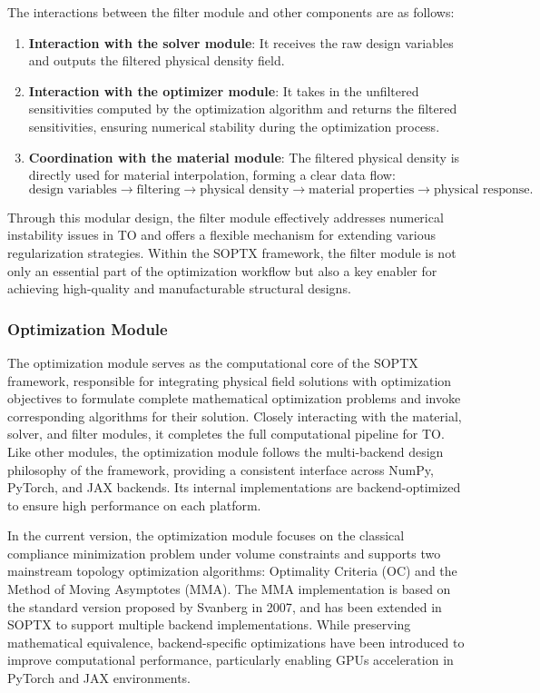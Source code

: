 \documentclass[mathpazo]{cicp}
\begin{document}
The interactions between the filter module and other components are as follows:
\begin{enumerate}
	\item \textbf{Interaction with the solver module}: It receives the raw design variables and outputs the filtered physical density field.
	\item \textbf{Interaction with the optimizer module}: It takes in the unfiltered sensitivities computed by the optimization algorithm and returns the filtered sensitivities, ensuring numerical stability during the optimization process.
	\item \textbf{Coordination with the material module}: The filtered physical density is directly used for material interpolation, forming a clear data flow:
	\begin{equation*}
		\text{design variables} \to \text{filtering} \to \text{physical density} \to \text{material properties} \to \text{physical response}.
	\end{equation*}
\end{enumerate}
Through this modular design, the filter module effectively addresses numerical instability issues in TO and offers a flexible mechanism for extending various regularization strategies. Within the SOPTX framework, the filter module is not only an essential part of the optimization workflow but also a key enabler for achieving high-quality and manufacturable structural designs.

\subsubsection{Optimization Module}
The optimization module serves as the computational core of the SOPTX framework, responsible for integrating physical field solutions with optimization objectives to formulate complete mathematical optimization problems and invoke corresponding algorithms for their solution. Closely interacting with the material, solver, and filter modules, it completes the full computational pipeline for TO. Like other modules, the optimization module follows the multi-backend design philosophy of the framework, providing a consistent interface across NumPy, PyTorch, and JAX backends. Its internal implementations are backend-optimized to ensure high performance on each platform.

In the current version, the optimization module focuses on the classical compliance minimization problem under volume constraints and supports two mainstream topology optimization algorithms: Optimality Criteria (OC) and the Method of Moving Asymptotes (MMA). The MMA implementation is based on the standard version proposed by Svanberg in 2007\cite{Svanberg2007MmaAG}, and has been extended in SOPTX to support multiple backend implementations. While preserving mathematical equivalence, backend-specific optimizations have been introduced to improve computational performance, particularly enabling GPUs acceleration in PyTorch and JAX environments.
\end{document}
